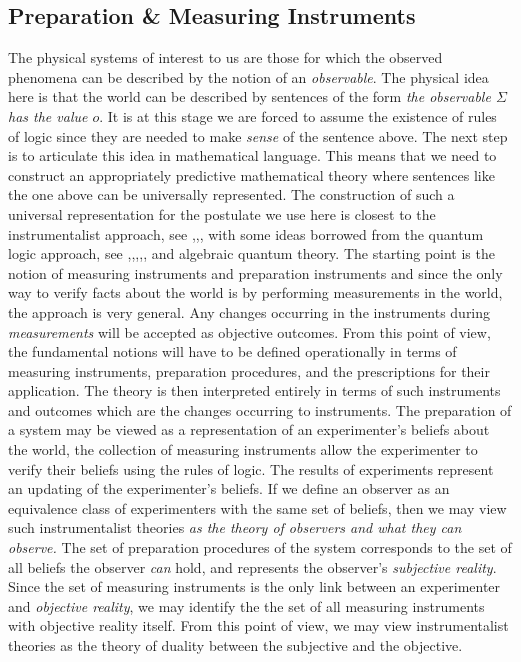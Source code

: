 \documentclass[11pt]{article}
\begin{document}
\subsection*{Preparation \& Measuring Instruments}
The physical systems of interest to us are those for which the observed phenomena can be described by the notion of an \emph{observable}. The physical idea here is that the world can be described by sentences of the form \emph{the observable $\Sigma$ has the value $o$}. It is at this stage we are forced to assume  the existence of rules of logic since they are needed to make \emph{sense} of the sentence above. The next step is to articulate this idea in mathematical language. This means that we need to construct an appropriately predictive mathematical theory where sentences like the one above can be universally represented. The construction of such a universal representation for the postulate we use here is closest to the instrumentalist approach, see \cite{Kraus},\cite{Ludwig1},\cite{Ludwig2}, with some ideas borrowed from the quantum logic approach, see \cite{Jauch},\cite{Kalmbach},\cite{Peres},\cite{Varadarajan},\cite{vonNeumann}, and algebraic quantum theory. The starting point is the notion of measuring instruments and preparation instruments and since the only way to verify facts about the world is by performing measurements in the world, the approach is very general. Any changes occurring in the instruments during \emph{measurements} will be accepted as objective outcomes. From this point of view, the fundamental notions will have to be defined operationally in terms of measuring instruments, preparation procedures, and the prescriptions for their application. The theory is then interpreted entirely in terms of such instruments and outcomes which are the changes occurring to instruments. 
\noindent The preparation of a system may be viewed as a representation of an experimenter's beliefs about the world, the collection of measuring instruments allow the experimenter to verify their beliefs using the rules of logic. The results of experiments represent an updating of the experimenter's beliefs. If we define an observer as an equivalence class of experimenters with the same set of beliefs, then we may view such instrumentalist theories \emph{as the theory of observers and what they can observe.} The set of preparation procedures of the system corresponds to the set of all beliefs the observer \emph{can} hold, and represents the observer's \emph{subjective reality}. Since the set of measuring instruments is the only link between an experimenter and \emph{objective reality}, we may identify the the set of all measuring instruments with objective reality itself. From this point of view, we may view instrumentalist theories as the theory of duality between the subjective and the objective. 
\end{document}
